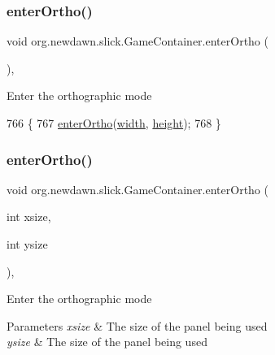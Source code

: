 \subsubsection{\texorpdfstring{enter\+Ortho()}{enterOrtho()}\hspace{0.1cm}{\footnotesize\ttfamily [1/2]}}
{\footnotesize\ttfamily void org.\+newdawn.\+slick.\+Game\+Container.\+enter\+Ortho (\begin{DoxyParamCaption}{ }\end{DoxyParamCaption})\hspace{0.3cm}{\ttfamily [inline]}, {\ttfamily [protected]}}

Enter the orthographic mode 
\begin{DoxyCode}
766                                 \{
767         \mbox{\hyperlink{classorg_1_1newdawn_1_1slick_1_1_game_container_a1e8c835b781b018347f50dcf37bbb5c2}{enterOrtho}}(\mbox{\hyperlink{classorg_1_1newdawn_1_1slick_1_1_game_container_a8c65160202b9f5aafde3fcf03e6155c9}{width}}, \mbox{\hyperlink{classorg_1_1newdawn_1_1slick_1_1_game_container_aac7312a21bbcaabec14be965c683d970}{height}});
768     \}
\end{DoxyCode}
\mbox{\label{classorg_1_1newdawn_1_1slick_1_1_game_container_aa8a6427283d666bb66f824a817ff9b0b}} 
\subsubsection{\texorpdfstring{enter\+Ortho()}{enterOrtho()}\hspace{0.1cm}{\footnotesize\ttfamily [2/2]}}
{\footnotesize\ttfamily void org.\+newdawn.\+slick.\+Game\+Container.\+enter\+Ortho (\begin{DoxyParamCaption}\item[{int}]{xsize,  }\item[{int}]{ysize }\end{DoxyParamCaption})\hspace{0.3cm}{\ttfamily [inline]}, {\ttfamily [protected]}}

Enter the orthographic mode


\begin{DoxyParams}{Parameters}
{\em xsize} & The size of the panel being used \\
\hline
{\em ysize} & The size of the panel being used \\
\hline
\end{DoxyParams}

